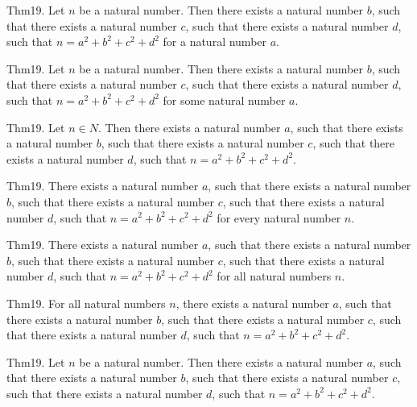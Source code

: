\documentclass{article}
\begin{document}
Thm19. Let $n$ be a natural number. Then there exists a natural number $b$, such that there exists a natural number $c$, such that there exists a natural number $d$, such that $n = a ^{ 2}+ b ^{ 2}+ c ^{ 2}+ d ^{ 2}$ for a natural number $a$.

Thm19. Let $n$ be a natural number. Then there exists a natural number $b$, such that there exists a natural number $c$, such that there exists a natural number $d$, such that $n = a ^{ 2}+ b ^{ 2}+ c ^{ 2}+ d ^{ 2}$ for some natural number $a$.

Thm19. Let $n \in N$. Then there exists a natural number $a$, such that there exists a natural number $b$, such that there exists a natural number $c$, such that there exists a natural number $d$, such that $n = a ^{ 2}+ b ^{ 2}+ c ^{ 2}+ d ^{ 2}$.

Thm19. There exists a natural number $a$, such that there exists a natural number $b$, such that there exists a natural number $c$, such that there exists a natural number $d$, such that $n = a ^{ 2}+ b ^{ 2}+ c ^{ 2}+ d ^{ 2}$ for every natural number $n$.

Thm19. There exists a natural number $a$, such that there exists a natural number $b$, such that there exists a natural number $c$, such that there exists a natural number $d$, such that $n = a ^{ 2}+ b ^{ 2}+ c ^{ 2}+ d ^{ 2}$ for all natural numbers $n$.

Thm19. For all natural numbers $n$, there exists a natural number $a$, such that there exists a natural number $b$, such that there exists a natural number $c$, such that there exists a natural number $d$, such that $n = a ^{ 2}+ b ^{ 2}+ c ^{ 2}+ d ^{ 2}$.

Thm19. Let $n$ be a natural number. Then there exists a natural number $a$, such that there exists a natural number $b$, such that there exists a natural number $c$, such that there exists a natural number $d$, such that $n = a ^{ 2}+ b ^{ 2}+ c ^{ 2}+ d ^{ 2}$.
\end{document}
